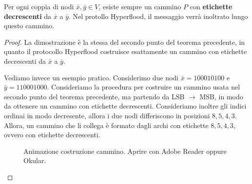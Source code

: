 \begin{teorema}[Correttezza]
    Per ogni coppia di nodi $\bar{x}, \bar{y} \in V$, esiste sempre un cammino $P$ con \textbf{etichette decrescenti} da $\bar{x}$ a $\bar{y}$. Nel protollo Hyperflood, il messaggio verrà inoltrato lungo questo cammino.
    \begin{proof}
        La dimostrazione è la stessa del secondo punto del teorema precedente, in quanto il protocollo Hyperflood costruisce esattamente un cammino con etichette decrescenti da $\bar{x}$ a $\bar{y}$.

        Vediamo invece un esempio pratico. Considerimo due nodi $\bar{x} = 100010100$ e $\bar{y} = 110001000$. Consideriamo la procedura per costruire un cammino usata nel secondo punto del teorema precedente, ma partendo da LSB $\to$ MSB, in modo da ottenere un cammino con etichette decrescenti. Consideriamo inoltre gli indici ordinai in modo decresente, allora i due nodi differiscono in posizioni $8, 5, 4, 3$. Allora, un cammino che li collega è formato dagli archi con etichette $8, 5, 4, 3$, ovvero con etichette decrescenti.
        
        \begin{figure}[htbp]
        \centering
        \caption{Animazione costruzione cammino. Aprire con Adobe Reader oppure Okular.}
        \label{fig:correttezza_hyperflood}
    \end{figure}    
    \end{proof}
\end{teorema}

